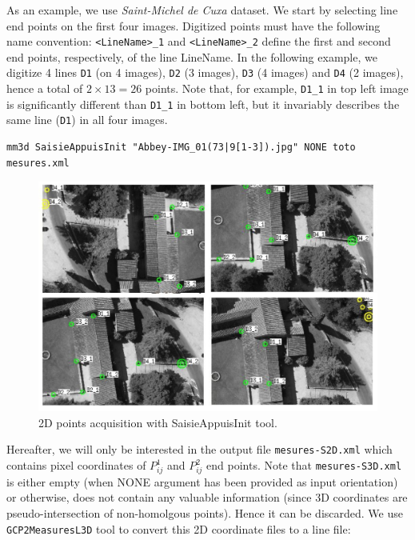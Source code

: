 \noindent As an example, we use \textit{Saint-Michel de Cuxa} dataset. We start by selecting line end points on the first four images. Digitized points must have the following name convention: \texttt{<LineName>\_1} and \texttt{<LineName>\_2} define the first and second end points, respectively, of the line LineName. In the following example, we digitize 4 lines \texttt{D1} (on 4 images), \texttt{D2} (3 images), \texttt{D3} (4 images) and \texttt{D4} (2 images), hence a total of $2 \times 13 = 26$ points. Note that, for example, \texttt{D1\_1} in top left image is significantly different than \texttt{D1\_1} in bottom left, but it invariably describes the same line (\texttt{D1}) in all four images. \newline

\begin{verbatim}
mm3d SaisieAppuisInit "Abbey-IMG_01(73|9[1-3]).jpg" NONE toto mesures.xml
\end{verbatim}

\begin{figure}
	\begin{center}
		\includegraphics[width=120mm]{FIGS/Cuxa/linesSaisieAppuisInit1.pdf}
	\end{center}
	\caption{2D points acquisition with SaisieAppuisInit tool.}
\end{figure}

\noindent Hereafter, we will only be interested in the output file \texttt{mesures-S2D.xml} which contains pixel coordinates of $P_{ij}^1$ and $P_{ij}^2$ end points. Note that \texttt{mesures-S3D.xml} is either empty (when NONE argument has been provided as input orientation) or otherwise, does not contain any valuable information (since 3D coordinates are pseudo-intersection of non-homolgous points). Hence it can be discarded. We use \texttt{GCP2MeasuresL3D} tool to convert this 2D coordinate files to a line file: \newline

